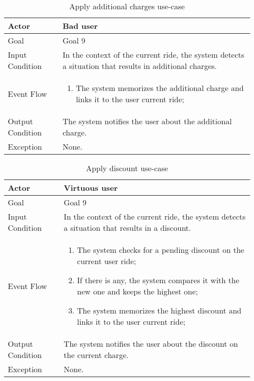 \begin{table}[H]
\begin{center}
\begin{tabular}{p{} | p{}}
\hline
Actor & Bad user\\
\hline
Goal & Goal 9\\
\hline
Input Condition & In the context of the current ride, the system detects a situation that results in additional charges.\\
\hline
Event Flow & 
\begin{enumerate}
\item The system memorizes the additional charge and links it to the user current ride;
\end{enumerate} \\
\hline
Output Condition & The system notifies the user about the additional charge.\\
\hline
Exception & None.\\
\hline
\end{tabular}
\end{center}
\caption{Apply additional charges use-case}
\label{apply_additional_charges_uc}
\end{table}

\begin{table}[H]
\begin{center}
\begin{tabular}{p{} | p{}}
\hline
Actor & Virtuous user\\
\hline
Goal & Goal 9\\
\hline
Input Condition & In the context of the current ride, the system detects a situation that results in a discount.\\
\hline
Event Flow & 
\begin{enumerate}
\item The system checks for a pending discount on the current user ride;
\item If there is any, the system compares it with the new one and keeps the highest one;
\item The system memorizes the highest discount and links it to the user current ride;
\end{enumerate} \\
\hline
Output Condition & The system notifies the user about the discount on the current charge.\\
\hline
Exception & None.\\
\hline
\end{tabular}
\end{center}
\caption{Apply discount use-case}
\label{apply_discounts_uc}
\end{table}